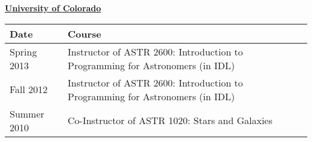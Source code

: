 \begin{minipage}{\textwidth}
    \vspace{12pt}
\textbf{\underline{University of Colorado}}

\begin{tabular}{ll}
     Date         & Course \\
     \hline
     Spring 2013  &   Instructor of ASTR 2600: Introduction to Programming for Astronomers (in IDL) \\
     Fall 2012    &   Instructor of ASTR 2600: Introduction to Programming for Astronomers (in IDL) \\
     Summer 2010  &   Co-Instructor of ASTR 1020: Stars and Galaxies \\
     \hline
\end{tabular}

\end{minipage}
\vspace{4mm}
